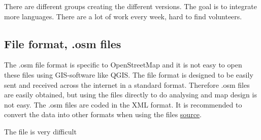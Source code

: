 There are different groups creating the different versions. The goal is to integrate more languages. There are a lot of work every week, hard to find volunteers. 


 \subsection{File format, .osm files}
The .osm file format is specific to OpenStreetMap and it is not easy to open these files using GIS-software like QGIS. The file format is designed to be easily sent and received across the internet in a standard format. Therefore .osm files are easily obtained, but using the files directly to do analysing and map design is not easy. The .osm files are coded in the XML format. It is recommended to convert the data into other formats when using the files \href{http://learnosm.org/en/osm-data/file-formats/}{source}. 

The file is very difficult








 